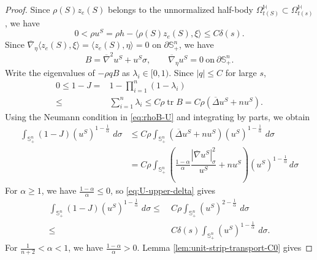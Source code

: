 \documentclass[11pt, reqno]{amsart}
\theoremstyle{remark}
\theoremstyle{definition}
\numberwithin{equation}{section}
\DeclareMathOperator{\tr}{tr}
\newcommand{\dd}{\,d}
\begin{document}
\begin{proof}
Since $\rho(S) z_e(S)$ belongs to the unnormalized half-body $\Omega_{t(S)}^{\mathbb{H}}\subset \Omega_{t(s)}^{\mathbb{H}}$, we have
\begin{equation}\label{eq:U-upper-delta}
        0<\rho u^S=\rho h- \langle \rho(S) z_e(S), \xi \rangle  \le  C\delta(s).
\end{equation}
Since $\overline{\nabla}_{\eta}\langle z_e(S),\xi \rangle = \langle z_e(S),\eta \rangle=0$ on $\partial\mathbb{S}_+^n$, we have
\begin{equation}\label{eq:rhoB-U}
        B=\overline{\nabla}^2 u^S+ u^S\sigma,
        \qquad \overline{\nabla}_\eta u^S=0\ \mathrm{on}\ \partial\mathbb{S}_+^n.
\end{equation}
Write the eigenvalues of $-\rho qB$ as $\lambda_i\in[0,1)$.  Since $|q|\le C$ for large $s$,
\begin{align*}
        0\le1-J
        =&1-\prod_{i=1}^n(1-\lambda_i)\\
        \le &\sum_{i=1}^n\lambda_i
        \le C\rho\tr B
        =C\rho(\overline{\Delta} u^S+nu^S).
\end{align*}
Using the Neumann condition in \eqref{eq:rhoB-U} and integrating
by parts, we obtain
\begin{align}
        \int_{\mathbb{S}^n_+}(1-J)(u^S)^{1-\frac{1}{\alpha}}\,\dd\sigma
        &\le C\rho\int_{\mathbb{S}^n_+}(\overline{\Delta} u^S+nu^S)(u^S)^{1-\frac{1}{\alpha}}\,\dd\sigma     \nonumber\\
        &=C\rho\int_{\mathbb{S}_+^n} \left( \frac{1-\alpha}{\alpha}\dfrac{|\overline{\nabla} u^S|_{\sigma}^2}{u^S} + n u^S \right)(u^S)^{1-\frac{1}{\alpha}}\dd \sigma\label{eq:BJ-B-direct-alpha}
\end{align}
For $\alpha\geq 1$, we have $\frac{1-\alpha}{\alpha}\leq 0$, so \eqref{eq:U-upper-delta} gives
\begin{align}\label{equ-alphageq1}
	\int_{\mathbb{S}^n_+}(1-J)(u^S)^{1-\frac{1}{\alpha}}\,\dd\sigma  \leq &~ C\rho \int_{\mathbb{S}^n_+} (u^S)^{2-\frac{1}{\alpha}} \,\dd\sigma \nonumber\\
    \leq &~C\delta(s)\int_{\mathbb{S}^n_+} (u^S)^{1-\frac{1}{\alpha}} \,\dd\sigma.
\end{align}
For $\frac{1}{n+2}<\alpha<1$, we have $\frac{1-\alpha}{\alpha}>0$.  Lemma \ref{lem:unit-strip-transport-C0} gives

\end{proof}
\end{document}
